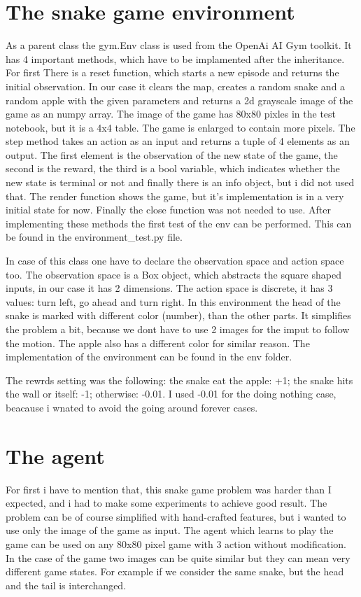 \documentclass[12p]{article}
\begin{document}
  \section{The snake game environment}
    As a parent class the gym.Env class is used from the OpenAi AI Gym toolkit. It has 4 important methods, which
    have to be implamented after the inheritance. For first There is a reset function, which starts a new episode
    and returns the initial observation. In our case it clears the map, creates a random snake and a random apple
    with the given parameters and returns a 2d grayscale image of the game as an numpy array. 
    The image of the game has 80x80 pixles in the test notebook, but it is a 4x4 table. The game is enlarged to contain more pixels.
    The step method takes an
    action as an input and returns a tuple of 4 elements as an output. The first element is the observation of the 
    new state of the game, the second is the reward, the third is a bool variable, which indicates whether the new state
    is terminal or not and finally there is an info object, but i did not used that. The render function shows the game,
    but it's implementation is in a very initial state for now. Finally the close function was not needed to use. 
    After implementing these methods the first test of the env can be performed. This can be found in the environment\_test.py 
    file. \par
    In case of this class one have to declare the observation space and action space too. The observation space is a Box object,
    which abstracts the square shaped inputs, in our case it has 2 dimensions. The action space is discrete, it has 3 values:
    turn left, go ahead and turn right. In this environment the head of the snake is marked with different color (number), than
    the other parts. It simplifies the problem a bit, because we dont have to use 2 images for the imput to follow the motion.
    The apple also has a different color for similar reason. The implementation of the environment can be found in the env folder.
    \par
    The rewrds setting was the following: the snake eat the apple: +1; the snake hits the wall or itself: -1;
    otherwise: -0.01. I used -0.01 for the doing nothing case, beacause i wnated to avoid the going around forever cases. 

  \section{The agent}
    For first i have to mention that, this snake game problem was harder than I expected, and i had to make some experiments to
    achieve good result. The problem can be of course simplified with hand-crafted features, but i wanted to
    use only the image of the game as input.
    The agent which learns to play the game can be used on any 80x80 pixel game with 3 action without modification. In the case of the game
    two images can be quite similar but they can mean very different game states. For example if we consider the
    same snake, but the head and the tail is interchanged. 
    
\end{document}
